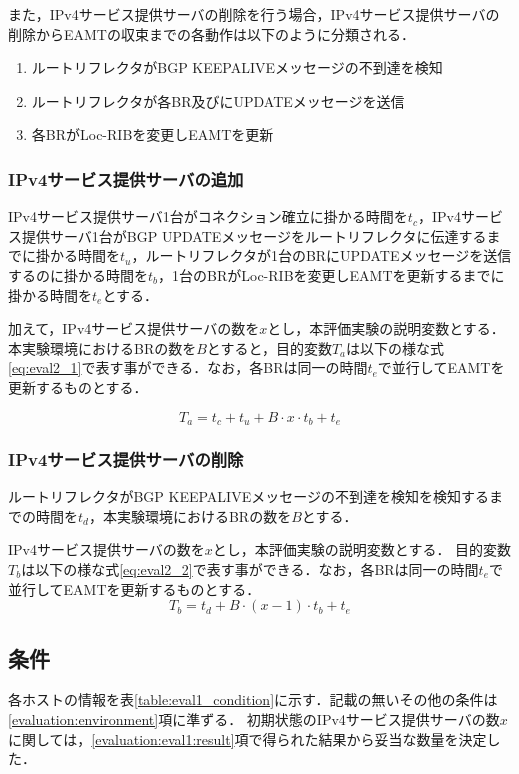 また，IPv4サービス提供サーバの削除を行う場合，IPv4サービス提供サーバの削除からEAMTの収束までの各動作は以下のように分類される．

\begin{enumerate}
    \item ルートリフレクタがBGP KEEPALIVEメッセージの不到達を検知
    \item ルートリフレクタが各BR及びにUPDATEメッセージを送信
    \item 各BRがLoc-RIBを変更しEAMTを更新
\end{enumerate}


\subsubsection{IPv4サービス提供サーバの追加}
IPv4サービス提供サーバ1台がコネクション確立に掛かる時間を$t_c$，IPv4サービス提供サーバ1台がBGP UPDATEメッセージをルートリフレクタに伝達するまでに掛かる時間を$t_u$，ルートリフレクタが1台のBRにUPDATEメッセージを送信するのに掛かる時間を$t_b$，1台のBRがLoc-RIBを変更しEAMTを更新するまでに掛かる時間を$t_e$とする．

加えて，IPv4サービス提供サーバの数を$x$とし，本評価実験の説明変数とする．
本実験環境におけるBRの数を$B$とすると，目的変数$T_a$は以下の様な式\ref{eq:eval2_1}で表す事ができる．なお，各BRは同一の時間$t_e$で並行してEAMTを更新するものとする．

\begin{equation}
    T_a = t_c + t_u + B \cdot x \cdot t_b + t_e
    \label{eq:eval2_1}
\end{equation}

\subsubsection{IPv4サービス提供サーバの削除}
ルートリフレクタがBGP KEEPALIVEメッセージの不到達を検知を検知するまでの時間を$t_d$，本実験環境におけるBRの数を$B$とする．

IPv4サービス提供サーバの数を$x$とし，本評価実験の説明変数とする．
目的変数$T_b$は以下の様な式\ref{eq:eval2_2}で表す事ができる．なお，各BRは同一の時間$t_e$で並行してEAMTを更新するものとする．
\begin{equation}
    T_b = t_d + B \cdot (x-1) \cdot t_b  + t_e
    \label{eq:eval2_2}
\end{equation}



\subsection{条件}
各ホストの情報を表\ref{table:eval1_condition}に示す．記載の無いその他の条件は\ref{evaluation:environment}項に準ずる．
初期状態のIPv4サービス提供サーバの数$x$に関しては，\ref{evaluation:eval1:result}項で得られた結果から妥当な数量を決定した．


